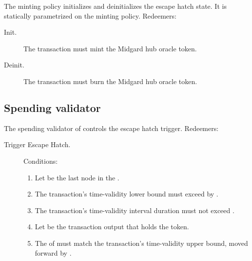 \documentclass[../midgard.tex]{subfiles}
\begin{document}
The  minting policy initializes and deinitializes the escape hatch state. It is statically parametrized on the  minting policy.
Redeemers:
\begin{description}
  \item[Init.] The transaction must mint the Midgard hub oracle token.
  \item[Deinit.] The transaction must burn the Midgard hub oracle token.
\end{description}

\subsection{Spending validator}%
\label{h:escape-hatch-spending-validator}%

The spending validator of  controls the escape hatch trigger.
Redeemers:
\begin{description}
  \item[Trigger Escape Hatch.] Conditions:
    \begin{enumerate}
      \item Let  be the last node in the .
      \item The transaction's time-validity lower bound must exceed  by .
      \item The transaction's time-validity interval duration must not exceed .
      \item Let  be the transaction output that holds the  token.
      \item The  of  must match the transaction's time-validity upper bound, moved forward by .
    \end{enumerate}
\end{description}
\end{document}
